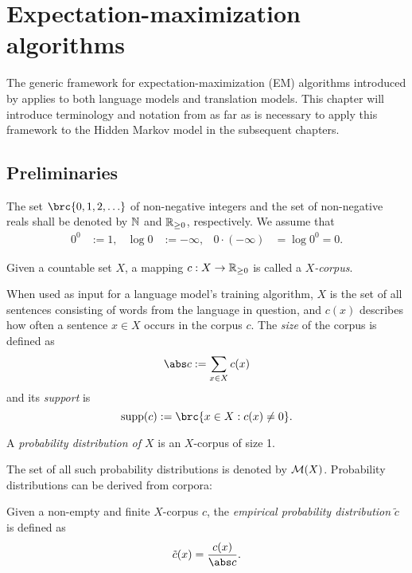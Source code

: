 \chapter{Expectation-maximization algorithms}

The generic framework for expectation-maximization (EM) algorithms introduced
by \cite{bucstuvog15} applies to both language models and translation models.
This chapter will introduce terminology and notation from \cite{bucstuvog15} as
far as is necessary to apply this framework to the Hidden Markov model in the
subsequent chapters.

\section{Preliminaries}

The set $\brc{0,1,2,\ldots}$ of non-negative integers and the set of
non-negative reals shall be denoted by $\mathbb N$ and $\mathbb R_{\geq0}$, respectively.
We assume that
\begin{align*}
 0^0 &:= 1, &
 \log 0 &:= -\infty, &
 0 \cdot (-\infty) &= \log 0^0 = 0.
\end{align*}

\begin{definition}
 Given a countable set $X$, a mapping $c: X \to \mathbb R_{\geq0}$ is called a
 \emph{$X$-corpus}.
\end{definition}

When used as input for a language model's training algorithm, $X$ is the set of
all sentences consisting of words from the language in question, and $c(x)$
describes how often a sentence $x\in X$ occurs in the corpus $c$. The
\emph{size} of the corpus is defined as
\[
 \abs c := \sum_{x\in X} c(x)
\]
and its \emph{support} is
\[
 \operatorname{supp}(c) := \brc{x\in X: c(x)\neq0}.
\]

\begin{definition}
 A \emph{probability distribution of $X$} is an $X$-corpus of size 1.
\end{definition}

The set of all such probability distributions is denoted by $\mathcal M(X)$.
Probability distributions can be derived from corpora:

\begin{definition}
 Given a non-empty and finite $X$-corpus $c$, the \emph{empirical probability
 distribution} $\tilde c$ is defined as
 \[
  \tilde c(x) = \frac{c(x)}{\abs c}.
 \]
\end{definition}

